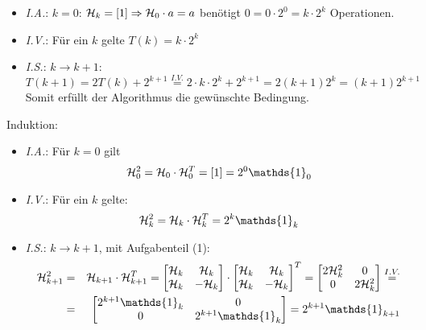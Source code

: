 \begin{flushenum}
	\begin{itemize}
		\item \textit{I.A.}: $k = 0$: $\mathcal{H}_k = [1] \Rightarrow \mathcal{H}_0 \cdot a = a$ benötigt $0 = 0\cdot 2^0 = k\cdot 2^k$ Operationen.

		\item \textit{I.V.}: Für ein $k$ gelte $T(k) = k\cdot 2^k$

		\item \textit{I.S.}: $k \rightarrow k + 1$:
			\[T(k+1) = 2 T(k) + 2^{k+1} \overset{I.V.}{=} 2\cdot k\cdot 2^k + 2^{k+1} = 2 (k+1)2^k = (k+1) 2^{k+1} \]
			Somit erfüllt der Algorithmus die gewünschte Bedingung.
	\end{itemize}

	\item Induktion:
		\begin{itemize}
			\item \textit{I.A.}: Für $k = 0$ gilt 
				\[ \H_0^2 = \H_0 \cdot \H_0^T = [1] = 2^0 \mathds{1}_0\]
	
			\item \textit{I.V.}: Für ein $k$ gelte:
				\[ \H_k^2 = \H_k \cdot \H_k^T = 2^k \mathds{1}_k \]

			\item \textit{I.S.}: $k \rightarrow k + 1$, mit Aufgabenteil (1):
				\begin{eqnarray*}
					\H_{k+1}^2 &=& \H_{k+1} \cdot \H_{k+1}^T = \begin{bmatrix}
						\H_k & \H_k \\
						\H_k & -\H_k \\
					\end{bmatrix} \cdot \begin{bmatrix}
						\H_k & \H_k \\
						\H_k & -\H_k \\
					\end{bmatrix}^T =
					\begin{bmatrix}
						2 \H_k^2 & 0 \\
						0 & 2 \H_k^2
					\end{bmatrix} \overset{I.V.}{=} \\
					&=&
					\begin{bmatrix}
						2^{k+1} \mathds{1}_k & 0 \\
						0 & 2^{k+1}\mathds{1}_k \\
					\end{bmatrix} = 
					2^{k+1} \mathds{1}_{k+1}
				\end{eqnarray*}
		\end{itemize}
\end{flushenum}
